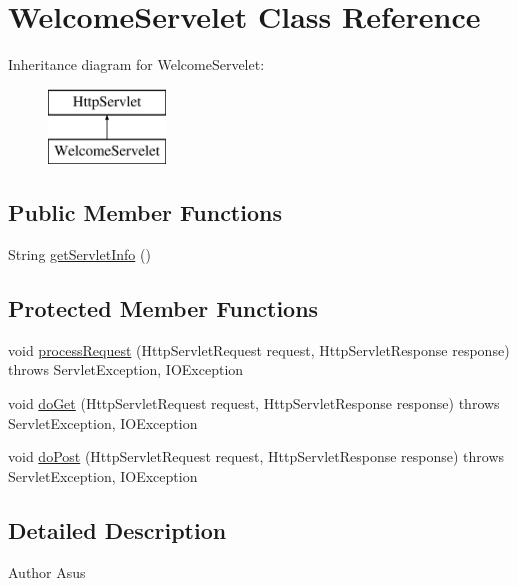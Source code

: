 \hypertarget{class_welcome_servelet}{}\section{Welcome\+Servelet Class Reference}
\label{class_welcome_servelet}
Inheritance diagram for Welcome\+Servelet\+:\begin{figure}[H]
\begin{center}
\leavevmode
\includegraphics[height=2.000000cm]{class_welcome_servelet}
\end{center}
\end{figure}
\subsection*{Public Member Functions}
\begin{DoxyCompactItemize}
\item 
String \mbox{\hyperlink{class_welcome_servelet_a9905a77fc2509601c0cab030c0230e84}{get\+Servlet\+Info}} ()
\end{DoxyCompactItemize}
\subsection*{Protected Member Functions}
\begin{DoxyCompactItemize}
\item 
void \mbox{\hyperlink{class_welcome_servelet_afde59590274b4c3f95446e9f08fea5ef}{process\+Request}} (Http\+Servlet\+Request request, Http\+Servlet\+Response response)  throws Servlet\+Exception, I\+O\+Exception 
\item 
void \mbox{\hyperlink{class_welcome_servelet_a31f53b6606c34f76392d0a8ad6cec74f}{do\+Get}} (Http\+Servlet\+Request request, Http\+Servlet\+Response response)  throws Servlet\+Exception, I\+O\+Exception 
\item 
void \mbox{\hyperlink{class_welcome_servelet_a24e729e76b82516b7c9de7d1173bcad3}{do\+Post}} (Http\+Servlet\+Request request, Http\+Servlet\+Response response)  throws Servlet\+Exception, I\+O\+Exception 
\end{DoxyCompactItemize}


\subsection{Detailed Description}
\begin{DoxyAuthor}{Author}
Asus 
\end{DoxyAuthor}


